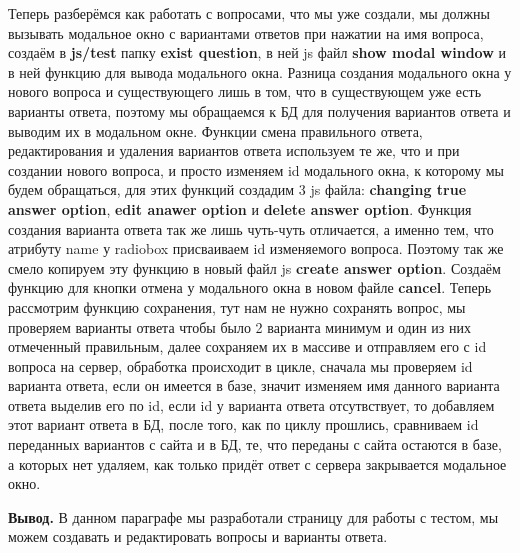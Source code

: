 \documentclass[12pt, oldlfont, amsfonts]{report}
\begin{document}
Теперь разберёмся как работать с вопросами, что мы уже создали, мы должны вызывать модальное окно с вариантами ответов при нажатии на имя вопроса, создаём в {\bf js/test} папку {\bf exist question}, в ней js файл {\bf show modal window} и в ней функцию для вывода модального окна. Разница создания модального окна у нового вопроса и существующего лишь в том, что в существующем уже есть варианты ответа, поэтому мы обращаемся к БД для получения вариантов ответа и выводим их в модальном окне. Функции смена правильного ответа, редактирования и удаления вариантов ответа используем те же, что и при создании нового вопроса, и просто изменяем id модального окна, к которому мы будем обращаться, для этих функций создадим 3 js файла: {\bf changing true answer option}, {\bf edit anawer option} и {\bf delete answer option}. Функция создания варианта ответа так же лишь чуть-чуть отличается, а именно тем, что атрибуту name у radiobox присваиваем id изменяемого вопроса. Поэтому так же смело копируем эту функцию в новый файл js {\bf create answer option}. Создаём функцию для кнопки отмена у модального окна в новом файле {\bf cancel}. Теперь рассмотрим функцию сохранения, тут нам не нужно сохранять вопрос, мы проверяем варианты ответа чтобы было 2 варианта минимум и один из них отмеченный правильным, далее сохраняем их в массиве и отправляем его с id вопроса на сервер, обработка происходит в цикле, сначала мы проверяем id варианта ответа, если он имеется в базе, значит изменяем имя данного варианта ответа выделив его по id, если id у варианта ответа отсутвствует, то добавляем этот вариант ответа в БД, после того, как по циклу прошлись, сравниваем id переданных вариантов с сайта и в БД, те, что переданы с сайта остаются в базе, а которых нет удаляем, как только придёт ответ с сервера закрывается модальное окно.

{\bf Вывод.} В данном параграфе мы разработали страницу для работы с тестом, мы можем создавать и редактировать вопросы и варианты ответа.
  
\end{document}
